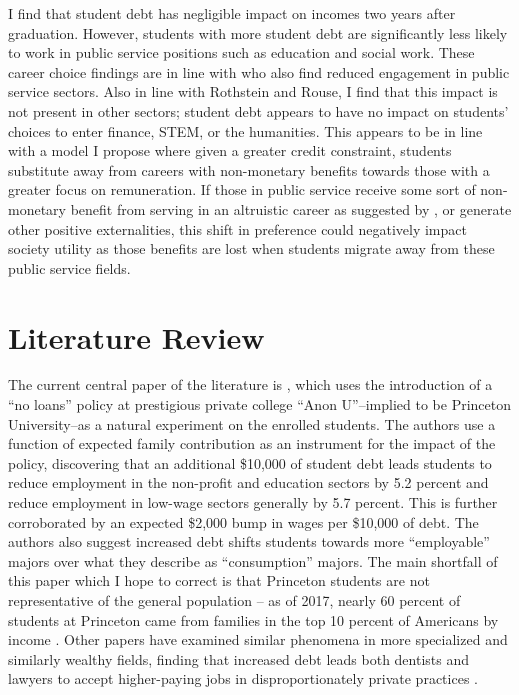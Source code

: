 \documentclass[12pt]{article}
\begin{document}
	I find that student debt has negligible impact on incomes two years after graduation. However, students with more student debt are significantly less likely to work in public service positions such as education and social work. These career choice findings are in line with \textcite{rothstein2011} who also find reduced engagement in public service sectors. Also in line with Rothstein and Rouse, I find that this impact is not present in other sectors; student debt appears to have no impact on students' choices to enter finance, STEM, or the humanities. This appears to be in line with a model I propose where given a greater credit constraint, students substitute away from careers with non-monetary benefits towards those with a greater focus on remuneration. If those in public service receive some sort of non-monetary benefit from serving in an altruistic career as suggested by \textcite{hanson1995}, or generate other positive externalities, this shift in preference could negatively impact society utility as those benefits are lost when students migrate away from these public service fields.
	
	\section{Literature Review}
	
	The current central paper of the literature is \textcite{rothstein2011}, which uses the introduction of a ``no loans'' policy at prestigious private college ``Anon U''--implied to be Princeton University--as a natural experiment on the enrolled students. The authors use a function of expected family contribution as an instrument for the impact of the policy, discovering that an additional \$10,000 of student debt leads students to reduce employment in the non-profit and education sectors by 5.2 percent and reduce employment in low-wage sectors generally by 5.7 percent. This is further corroborated by an expected \$2,000 bump in wages per \$10,000 of debt. The authors also suggest increased debt shifts students towards more ``employable'' majors over what they describe as ``consumption'' majors. The main shortfall of this paper which I hope to correct is that Princeton students are not representative of the general population -- as of 2017, nearly 60 percent of students at Princeton came from families in the top 10 percent of Americans by income \parencite{aisch2017}. Other papers have examined similar phenomena in more specialized and similarly wealthy fields, finding that increased debt leads both dentists and lawyers to accept higher-paying jobs in disproportionately private practices \parencite{nicholson2015, field2009}.
	
\end{document}
